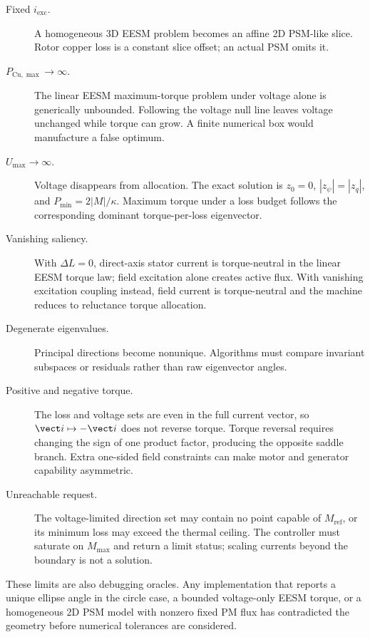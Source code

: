 \begin{description}
 \item[Fixed \(i_{\mathrm{exc}}\).] A homogeneous 3D EESM problem becomes an
 affine 2D PSM-like slice. Rotor copper loss is a constant slice offset; an
 actual PSM omits it.

 \item[\(P_{\mathrm{Cu},\max}\to\infty\).] The linear EESM maximum-torque
 problem under voltage alone is generically unbounded. Following the voltage
 null line leaves voltage unchanged while torque can grow. A finite numerical
 box would manufacture a false optimum.

 \item[\(U_{\max}\to\infty\).] Voltage disappears from allocation. The exact
 solution is \(z_0=0\), \(|z_\psi|=|z_q|\), and
 \(P_{\min}=2|M|/\kappa\). Maximum torque under a loss budget follows the
 corresponding dominant torque-per-loss eigenvector.

 \item[Vanishing saliency.] With \(\Delta L=0\), direct-axis stator current is
 torque-neutral in the linear EESM torque law; field excitation alone creates
 active flux. With vanishing excitation coupling instead, field current is
 torque-neutral and the machine reduces to reluctance torque allocation.

 \item[Degenerate eigenvalues.] Principal directions become nonunique.
 Algorithms must compare invariant subspaces or residuals rather than raw
 eigenvector angles.

 \item[Positive and negative torque.] The loss and voltage sets are even in
 the full current vector, so \(\vect i\mapsto-\vect i\) does not reverse torque.
 Torque reversal requires changing the sign of one product factor, producing
 the opposite saddle branch. Extra one-sided field constraints can make motor
 and generator capability asymmetric.

 \item[Unreachable request.] The voltage-limited direction set may contain no
 point capable of \(M_{\mathrm{ref}}\), or its minimum loss may exceed the
 thermal ceiling. The controller must saturate on \(M_{\max}\) and return a
 limit status; scaling currents beyond the boundary is not a solution.
\end{description}

These limits are also debugging oracles. Any implementation that reports a
unique ellipse angle in the circle case, a bounded voltage-only EESM torque,
or a homogeneous 2D PSM model with nonzero fixed PM flux has contradicted the
geometry before numerical tolerances are considered.
